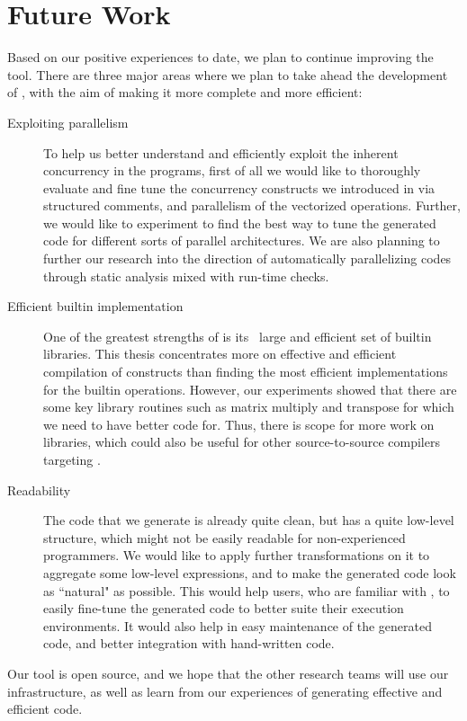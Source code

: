 \section{Future Work}
Based on our positive experiences to date,  we plan to continue
improving the \mixten tool.  There are three major areas where we plan to take
ahead the development of \mixten, with the aim of making it more complete and
more efficient:
\begin{description}

\item[Exploiting parallelism] To help us better understand and efficiently
exploit the inherent concurrency in the \matlab programs, first of all we would 
like to thoroughly evaluate and fine tune
the concurrency constructs we introduced in \matlab via structured comments, and
parallelism of the vectorized operations. Further, we would like to experiment
to find the best way to tune the generated code for different
sorts of parallel architectures. We are also planning to further our research
into the direction of automatically parallelizing \matlab codes through
static analysis mixed with run-time checks.   

\item[Efficient builtin implementation] One of the greatest strengths of
\matlab is its \ large and efficient set of
builtin libraries. This thesis concentrates more on effective and efficient
compilation of \matlab constructs than finding the most efficient
\xten implementations for the builtin operations. However, our experiments showed that there
are some key library routines such as matrix multiply and transpose for
which we need to have better \xten code for. Thus, there is scope for more
work on \xten libraries, which could also be useful for other
source-to-source compilers targeting \xten.

\item[Readability] The code that we generate is already quite
clean, but has a quite low-level structure, which might not be easily readable for
non-experienced \xten programmers. We would like to apply further transformations on it to
aggregate some low-level expressions, and to make the generated code
look as ``natural" as possible. This would help \mixten users, who are familiar
with \xten, to easily
fine-tune the generated \xten code to better suite their execution environments.
It would also help in easy maintenance of the generated \xten code, and better
integration with hand-written \xten code.   

\end{description}

Our tool is open source, and we hope that the other research teams will use
our infrastructure, as well as learn from our experiences of generating
effective and efficient \xten code.
